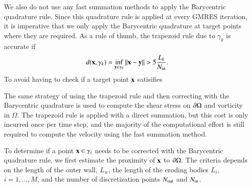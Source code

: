 \documentclass[preprint, 10pt]{elsarticle}
\begin{document}
We also do not use any fast summation methods to apply the Barycentric
quadrature rule.  Since this quadrature rule is applied at every GMRES
iteration, it is imperative that we only apply the Barycentric
quadrature at target points where they are required.  As a rule of
thumb, the trapezoid rule due to $\gamma_k$ is accurate if
\begin{align}
  d({\mathbf{x}},\gamma_k) = \inf_{{\mathbf{y}} \in \gamma_k} \|{\mathbf{x}} - {\mathbf{y}}\| > 
    5 \frac{L_k}{N_{\mathrm{in}}}.
\end{align}
To avoid having to check if a target point ${\mathbf{x}}$ satisifies

The same strategy of using the trapezoid rule and then correcting with
the Barycentric quadrature is used to compute the shear stress on
${\partial}\Omega$ and vorticity in $\Omega$.  The trapezoid rule is applied
with a direct summation, but this cost is only incurred once per time
step, and the majority of the computational effort is still required to
compute the velocity using the fast summation method.

To determine if a point ${\mathbf{x}} \in \gamma_i$ needs to be corrected with
the Barycentric quadrature rule, we first estimate the proximity of
${\mathbf{x}}$ to ${\partial}\Omega$.  The criteria depends on the length of the outer
wall, $L_w$, the length of the eroding bodies $L_i$, $i=1,\ldots,M$, and
the number of discretization points $N_{\mathrm{out}}$ and $N_{\mathrm{in}}$.  
\end{document}

